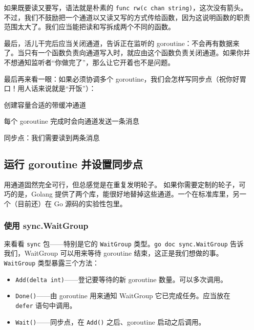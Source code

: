 如果既要读又要写，语法就是朴素的 \texttt{func rw(c chan string)}，这次没有箭头。不过，我们不鼓励把一个通道以又读又写的方式传给函数，因为这说明函数的职责范围太大了。我们应当能把读和写拆成两个不同的函数。

最后，活儿干完后应当关闭通道，告诉正在监听的 goroutine：不会再有数据来了。当只有一个函数负责向通道写入时，就应由这个函数负责关闭通道。如果你并不想通知监听者``你做完了''，那么让它开着也不是问题。

最后再来看一眼：如果必须协调多个 goroutine，我们会怎样写同步点（祝你好胃口！用人话来说就是``开饭''）：


\begin{codeannotations}
\item 创建容量合适的带缓冲通道
\item 每个 goroutine 完成时会向通道发送一条消息
\item 同步点：我们需要读到两条消息
\end{codeannotations}

\subsection{运行 goroutine 并设置同步点}

用通道固然完全可行，但总感觉是在重复发明轮子。
如果你需要定制的轮子，可巧的是，Golang 提供了两个库，能很好地替掉这些通道。一个在标准库里，另一个（目前还）在 Go 源码的实验性包里。

\subsubsection*{使用 sync.WaitGroup}

来看看 \texttt{sync} 包——特别是它的 \texttt{WaitGroup} 类型。\texttt{go doc sync.WaitGroup} 告诉我们，WaitGroup 可以用来等待 goroutine 结束，这正是我们想做的事。\texttt{WaitGroup} 类型暴露三个方法：

\begin{itemize}
  \item \texttt{Add(delta int)}——登记要等待的新 goroutine 数量。可以多次调用。
  \item \texttt{Done()}——由 goroutine 用来通知 WaitGroup 它已完成任务。应当放在 \texttt{defer} 语句中调用。
  \item \texttt{Wait()}——同步点，在 \texttt{Add()} 之后、goroutine 启动之后调用。
\end{itemize}

